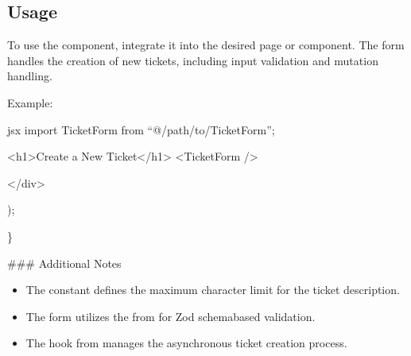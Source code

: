 \documentclass[letterpaper,10pt,english]{sphinxmanual}
\begin{document}
\subsection{Usage}
\label{\detokenize{forms/ticket:usage}}
\sphinxAtStartPar
To use the  component, integrate it into the desired page or component. The form handles the creation of new tickets, including input validation and mutation handling.

\sphinxAtStartPar
Example:

\sphinxAtStartPar
{\color{red}\bfseries{}\textasciigrave{}\textasciigrave{}}{\color{red}\bfseries{}\textasciigrave{}}jsx
import TicketForm from “@/path/to/TicketForm”;
\begin{description}
\begin{description}
\begin{description}
\sphinxAtStartPar
\textless{}h1\textgreater{}Create a New Ticket\textless{}/h1\textgreater{}
\textless{}TicketForm /\textgreater{}

\end{description}

\sphinxAtStartPar
\textless{}/div\textgreater{}

\end{description}

\sphinxAtStartPar
);

\end{description}

\sphinxAtStartPar
\}

\sphinxAtStartPar
\#\#\# Additional Notes
\begin{itemize}
\item {} 
\sphinxAtStartPar
The  constant defines the maximum character limit for the ticket description.

\item {} 
\sphinxAtStartPar
The form utilizes the  from  for Zod schema\sphinxhyphen{}based validation.

\item {} 
\sphinxAtStartPar
The  hook from  manages the asynchronous ticket creation process.

\end{itemize}
\end{document}
